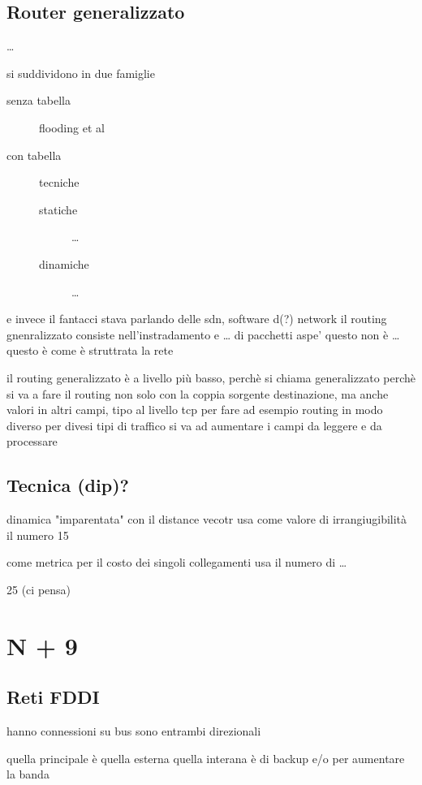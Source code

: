 \documentclass[11pt]{article}
\begin{document}
\subsection{Router generalizzato}
\label{sec:org7f63742}
\ldots{}

si suddividono in due famiglie
\begin{description}
\item[{senza tabella}] flooding et al
\item[{con tabella}] tecniche
\begin{description}
\item[{statiche}] \ldots{}
\item[{dinamiche}] \ldots{}
\end{description}
\end{description}

e invece il fantacci stava parlando delle sdn, software d(?) network
il routing gnenralizzato consiste nell'instradamento e \ldots{} di pacchetti
aspe' questo non è \ldots{} questo è come è struttrata la rete

il routing generalizzato è a livello più basso, perchè si chiama generalizzato
perchè si va a fare il routing non solo con la coppia sorgente destinazione, ma anche valori in altri campi, tipo al livello tcp
per fare ad esempio routing in modo diverso per divesi tipi di traffico 
si va ad aumentare i campi da leggere e da processare

\subsection{Tecnica (dip)?}
\label{sec:orga851653}
dinamica
"imparentata" con il distance vecotr
usa come valore di irrangiugibilità il numero 15

come metrica per il costo dei singoli collegamenti usa il numero di \ldots{}

25
(ci pensa)

\section{N + 9}
\label{sec:orgba6ff6d}
\subsection{Reti FDDI}
\label{sec:org09ec889}
hanno connessioni su bus
sono entrambi direzionali

quella principale è quella esterna
quella interana è di backup e/o per aumentare la banda
\end{document}
